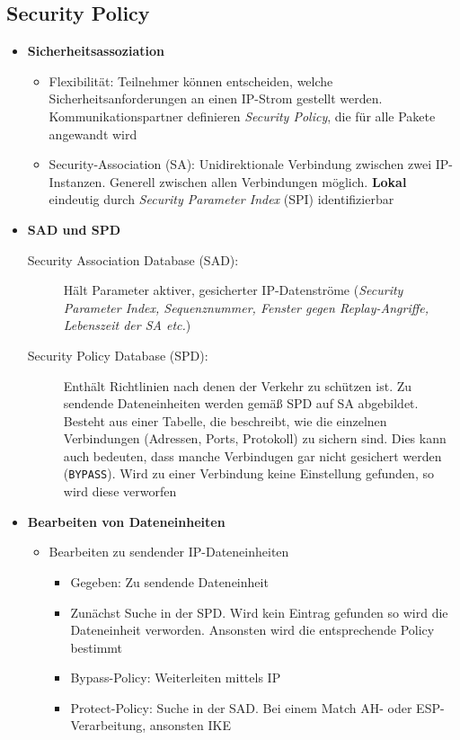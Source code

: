 \subsection{Security Policy}
\begin{itemize}
	\item \textbf{Sicherheitsassoziation}
	\begin{itemize}
		\item Flexibilität: Teilnehmer können entscheiden, welche Sicherheitsanforderungen an einen IP-Strom gestellt werden. Kommunikationspartner definieren \textit{Security Policy}, die für alle Pakete angewandt wird
		\item Security-Association (SA): Unidirektionale Verbindung zwischen zwei IP-Instanzen. Generell zwischen allen Verbindungen möglich. \textbf{Lokal} eindeutig durch \textit{Security Parameter Index} (SPI) identifizierbar
	\end{itemize}
	\item \textbf{SAD und SPD}
	\begin{description}
		\item[Security Association Database (SAD):] Hält Parameter aktiver, gesicherter IP-Datenströme (\textit{Security Parameter Index, Sequenznummer, Fenster gegen Replay-Angriffe, Lebenszeit der SA etc.})
		\item[Security Policy Database (SPD):] Enthält Richtlinien nach denen der Verkehr zu schützen ist. Zu sendende Dateneinheiten werden gemäß SPD auf SA abgebildet. Besteht aus einer Tabelle, die beschreibt, wie die einzelnen Verbindungen (Adressen, Ports, Protokoll) zu sichern sind. Dies kann auch bedeuten, dass manche Verbindugen gar nicht gesichert werden (\texttt{BYPASS}). Wird zu einer Verbindung keine Einstellung gefunden, so wird diese verworfen
	\end{description}
	\item \textbf{Bearbeiten von Dateneinheiten}
	\begin{itemize}
		\item Bearbeiten zu sendender IP-Dateneinheiten
		\begin{itemize}
			\item Gegeben: Zu sendende Dateneinheit
			\item Zunächst Suche in der SPD. Wird kein Eintrag gefunden so wird die Dateneinheit verworden. Ansonsten wird die entsprechende Policy bestimmt
			\item Bypass-Policy: Weiterleiten mittels IP
			\item Protect-Policy: Suche in der SAD. Bei einem Match AH- oder ESP-Verarbeitung, ansonsten IKE

\end{itemize}
\end{itemize}
\end{itemize}

